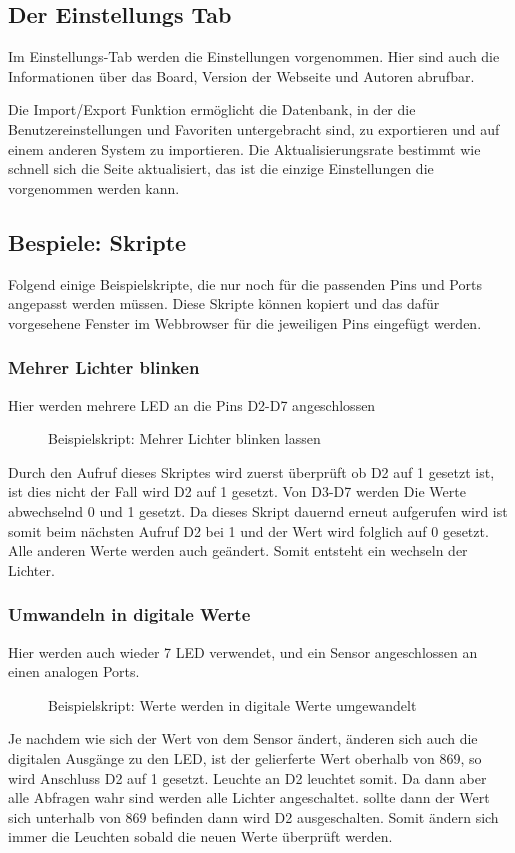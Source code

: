 \subsection{Der Einstellungs Tab}
Im Einstellungs-Tab werden die Einstellungen vorgenommen. Hier sind auch die
Informationen über das Board, Version der Webseite und Autoren abrufbar.

Die Import/Export Funktion ermöglicht die Datenbank, in der die
Benutzereinstellungen und Favoriten untergebracht sind, zu exportieren und auf einem anderen System zu
importieren. Die Aktualisierungsrate bestimmt wie schnell sich die Seite
aktualisiert, das ist die einzige Einstellungen die vorgenommen werden kann.

\subsection{Bespiele: Skripte}
Folgend einige Beispielskripte, die nur noch für die passenden Pins und Ports
angepasst werden müssen. Diese Skripte können kopiert und das dafür vorgesehene Fenster
im Webbrowser für die jeweiligen Pins eingefügt werden.

\subsubsection{Mehrer Lichter blinken}

Hier werden mehrere LED an die Pins D2-D7 angeschlossen\
\begin{figure}[H]

\caption{Beispielskript: Mehrer Lichter blinken lassen}
\label{output}
\end{figure}

Durch den Aufruf dieses Skriptes wird zuerst überprüft ob D2 auf 1
gesetzt ist, ist dies nicht der Fall wird D2 auf 1 gesetzt. Von D3-D7
werden Die Werte abwechselnd 0 und 1 gesetzt. Da dieses Skript dauernd
erneut aufgerufen wird ist somit beim nächsten Aufruf D2 bei 1 und der
Wert wird folglich auf 0 gesetzt. Alle anderen Werte werden auch
geändert. Somit entsteht ein wechseln der Lichter.\newline

\subsubsection{Umwandeln in digitale Werte}
Hier werden auch wieder 7 LED verwendet, und ein Sensor angeschlossen
an einen analogen Ports.
\begin{figure}[H]

\caption{Beispielskript: Werte werden in digitale Werte umgewandelt}
\label{output}
\end{figure}
Je nachdem wie sich der Wert von dem Sensor ändert, änderen sich auch die
digitalen Ausgänge zu den LED, ist der gelierferte Wert oberhalb von
869, so wird Anschluss D2 auf 1 gesetzt. Leuchte an D2 leuchtet somit. Da dann
aber alle Abfragen wahr sind werden alle Lichter angeschaltet. sollte dann der
Wert sich unterhalb von 869 befinden dann wird D2 ausgeschalten. Somit ändern
sich immer die Leuchten sobald die neuen Werte überprüft werden.

